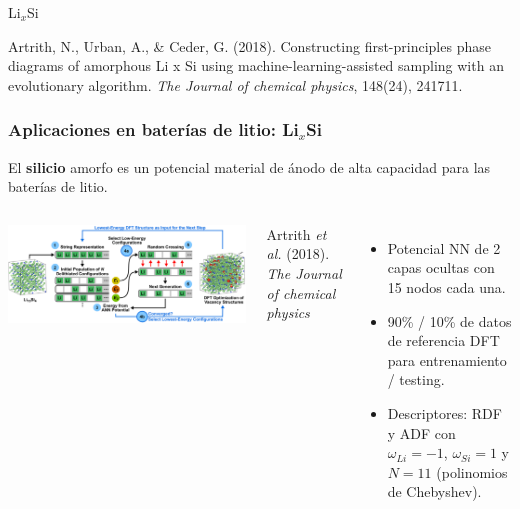 \documentclass[aspectratio=169]{beamer}
\let\oldtextbf\textbf
\renewcommand{\textbf}[1]{\textcolor{nordblue}{\oldtextbf{#1}}}
\begin{document}
    \begin{frame}
        \begin{center}
            {\huge Li$_x$Si}
        \end{center}
        \tiny{
            Artrith, N., Urban, A., \& Ceder, G. (2018). Constructing 
            first-principles phase diagrams of amorphous Li x Si using 
            machine-learning-assisted sampling with an evolutionary algorithm. 
            \textit{The Journal of chemical physics}, 148(24), 241711.
        }
    \end{frame}
    
    \begin{frame}
        \frametitle{Aplicaciones en baterías de litio: Li$_x$Si}
        
        El \textbf{silicio} amorfo es un potencial material de ánodo de alta
        capacidad para las baterías de litio.
        
        \begin{columns}
            \begin{center}
                \includegraphics[width=\columnwidth]{LiSi-metodo.png}
            \end{center}
            \tiny{Artrith \textit{et al.} (2018). \textit{The Journal of chemical
            physics}}

            \pause
            
            \begin{itemize}
                \item Potencial NN de 2 capas ocultas con 15 nodos cada una.
                \item 90\% / 10\% de datos de referencia DFT para entrenamiento / 
                    testing.
                \item Descriptores: RDF y ADF con $\omega_{Li} = -1$, 
                    $\omega_{Si} = 1$ y $N = 11$ (polinomios de Chebyshev).
            \end{itemize}
        \end{columns}
            
    \end{frame}
    
\end{document}
